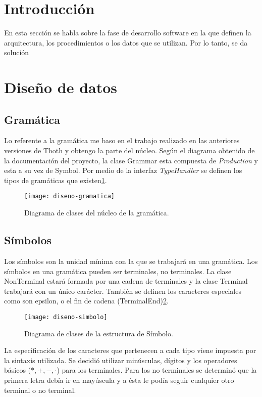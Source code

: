 
\section{Introducción}
En esta sección se habla sobre la fase de desarrollo software en la que definen la arquitectura, los procedimientos o los datos que se utilizan. Por lo tanto, se da solución

\section{Diseño de datos}

\subsection{Gramática}
Lo referente a la gramática me baso en el trabajo realizado en las anteriores versiones de Thoth\cite{thothv2} y obtengo la parte del núcleo. Según el diagrama obtenido de la documentación del proyecto, la clase Grammar esta compuesta de \emph{Production} y esta a su vez de Symbol. Por medio de la interfaz \emph{TypeHandler} se definen los tipos de gramáticas que existen\ref{fig:4.1}.

\begin{figure}[h]
\centering
\texttt{[image: diseno-gramatica]}
\caption{Diagrama de clases del núcleo de la gramática\cite{thothv2}.}
\label{fig:4.1}
\end{figure}


\subsection{Símbolos}

Los símbolos son la unidad mínima con la que se trabajará en una gramática. Los símbolos en una gramática pueden ser terminales, no terminales. La clase NonTerminal estará formada por una cadena de terminales y la clase Terminal trabajará con un único carácter. También se definen los caracteres especiales como son epsilon, o el fin de cadena (TerminalEnd)\ref{fig:4.2}.

\begin{figure}[h]
\centering
\texttt{[image: diseno-simbolo]}
\caption{Diagrama de clases de la estructura de Símbolo.}
\label{fig:4.2}
\end{figure}

La especificación de los caracteres que pertenecen a cada tipo viene impuesta por la sintaxis utilizada. Se decidió utilizar minúsculas, dígitos y los operadores básicos ($\ast,+,-,\cdot$) para los terminales. Para los no terminales se determinó que la primera letra debía ir en mayúscula y a ésta le podía seguir cualquier otro terminal o no terminal.

